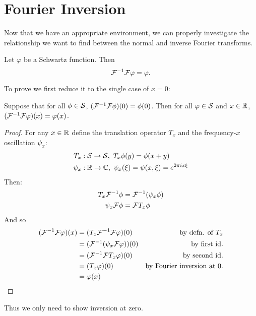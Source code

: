     \section{Fourier Inversion}
      Now that we have an appropriate environment, we can properly investigate the relationship we want to find between the normal and inverse Fourier transforms.
      \begin{thm}
        \label{thm:fourinv}
        Let $\varphi$ be a Schwartz function.
        Then \[\F^{-1}\F \varphi = \varphi\text{.}\]
      \end{thm}
      To prove  we first reduce it to the single case of $x=0$:
      \begin{claim}
        Suppose that for all $\phi\in\S$, $(\F^{-1}\F\phi)(0) = \phi(0)$.
        Then for all $\varphi\in\S$ and $x\in\R$, $(\F^{-1}\F\varphi)(x)=\varphi(x)$.
        \begin{proof}
          For any $x\in\R$ define the translation operator $T_x$ and the frequency-$x$ oscillation $\psi_x$:
          \begin{align*}
            T_x&:\S\rightarrow\S,\ T_x\phi(y) = \phi(x+y)\\
            \psi_x&:\R\rightarrow\C,\ \psi_x(\xi) = \psi(x,\xi) = e^{2\pi i x \xi}
          \end{align*}
          Then: 
          \begin{align*}
            T_x\F^{-1}\phi &= \F^{-1}(\psi_x\phi)\\
            \psi_x\F\phi &= \F T_x\phi
          \end{align*}
          And so
          \begin{align*}
            (\F^{-1}\F\varphi)(x) &= (T_x\F^{-1}\F\varphi)(0) &\text{by defn. of $T_x$}\\
            &= (\F^{-1}(\psi_x\F\varphi))(0) &\text{by first id.}\\
            &= (\F^{-1}\F T_x\varphi)(0)  &\text{by second id.}\\
            &= (T_x\varphi)(0) &\text{by Fourier inversion at 0.}\\
            &= \varphi(x)&\qedhere
          \end{align*}
        \end{proof}
      \end{claim}
      Thus we only need to show inversion at zero.

